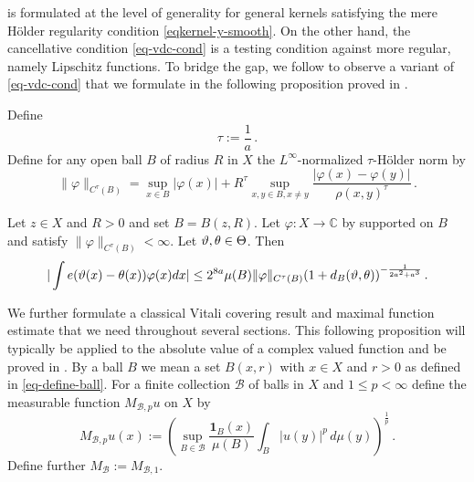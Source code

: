  is formulated at the level of generality
for general kernels satisfying the mere H\"older regularity condition \eqref{eqkernel-y-smooth}. On the other hand, the cancellative condition \eqref{eq-vdc-cond} is a testing condition against more regular,
namely Lipschitz functions. To bridge the gap, we follow \cite{zk-polynomial} to observe a variant of \eqref{eq-vdc-cond} that we formulate
in the following proposition proved in .


Define
\begin{equation}
    \tau:=\frac 1a\, .
\end{equation}
Define for any open ball $B$ of radius $R$ in $X$ the $L^\infty$-normalized $\tau$-H\"older norm by
\begin{equation}
    \label{eq-Holder-norm}
    \|\varphi\|_{C^\tau(B)} = \sup_{x \in B} |\varphi(x)| + R^\tau \sup_{x,y \in B, x \neq y} \frac{|\varphi(x) - \varphi(y)|}{\rho(x,y)^\tau}\,.
\end{equation}


\begin{proposition}
    \label{Holder-van-der-Corput}
    \leanok
     Let $z\in X$ and $R>0$ and set $B=B(z,R)$.
     Let $\varphi: X \to \mathbb{C}$ by
     supported on $B$ and satisfy $\|{\varphi}\|_{C^\tau(B)}<\infty$.
     Let ${\vartheta}, {\theta} \in {\Theta}$. Then
    \begin{equation}
        \label{eq-vdc-cond-tau-2}
        |\int e({\vartheta}(x)-{{\theta}(x)})\varphi(x) dx|\le
         2^{8a} \mu(B) \|{\varphi}\|_{C^\tau(B)}
       (1 + d_{B}({\vartheta},{\theta}))^{-\frac{1}{2a^2+a^3}}
    \,.
    \end{equation}
\end{proposition}

We further formulate a classical Vitali covering result
and maximal function estimate that we need throughout several sections.
This following proposition will typically be applied to the absolute value of a complex valued function and be proved in . By a ball $B$ we mean a set $B(x,r)$ with $x\in X$
and $r>0$ as defined in \eqref{eq-define-ball}.
For a finite collection $\mathcal{B}$ of balls in $X$
and $1\le p< \infty$ define the measurable function $M_{\mathcal{B},p}u$ on $X$ by
\begin{equation}\label{def-hlm}
    M_{\mathcal{B},p}u(x):=\left(\sup_{B\in \mathcal{B}} \frac{\mathbf{1}_{B}(x)}{\mu(B)}\int _{B} |u(y)|^p\, d\mu(y)\right)^\frac 1p\, .
\end{equation}
Define further $M_{\mathcal{B}}:=M_{\mathcal{B},1}$.

